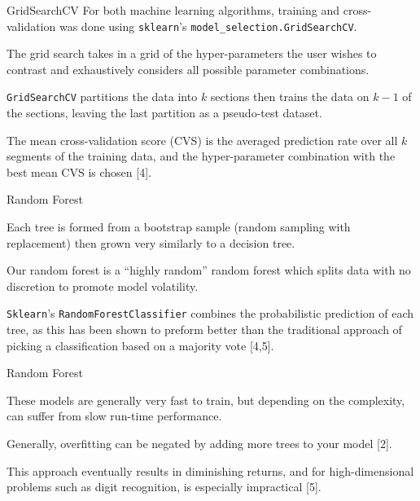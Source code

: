 \documentclass[titlepage,leqno]{beamer}%
\begin{document}
\begin{frame}[fragile]{GridSearchCV}
\begingroup
\small
For both machine learning algorithms, training and cross-validation was done using \verb+sklearn+'s \verb+model_selection.GridSearchCV+.

\vspace{3.75mm}

The grid search takes in a grid of the hyper-parameters the user wishes to contrast and exhaustively considers all possible parameter combinations.

\vspace{3.75mm}

\verb+GridSearchCV+ partitions the data into $k$ sections then trains the data on $k-1$ of the sections, leaving the last partition as a pseudo-test dataset.

\vspace{3.75mm}

The mean cross-validation score (CVS) is the averaged prediction rate over all $k$ segments of the training data, and the hyper-parameter combination with the best mean CVS is chosen [4]. 
\endgroup
\end{frame}
\begin{frame}[fragile]{Random Forest}

Each tree is formed from a bootstrap sample (random sampling with replacement) then grown very similarly to a decision tree. 

\vspace{3.75mm}

Our random forest is a ``highly random'' random forest which splits data with no discretion to promote model volatility.

\vspace{3.75mm}

\verb+Sklearn+'s \verb+RandomForestClassifier+ combines the probabilistic prediction of each tree, as this has been shown to preform better than the traditional approach of picking a classification based on a majority vote [4,5].

\end{frame}
\begin{frame}{Random Forest}

These models are generally very fast to train, but depending on the complexity, can suffer from slow run-time performance. 

\vspace{3.75mm}

Generally, overfitting can be negated by adding more trees to your model [2]. 

\vspace{3.75mm}

This approach eventually results in diminishing returns, and for high-dimensional problems such as digit recognition, is especially impractical [5].

\end{frame}
\end{document}
